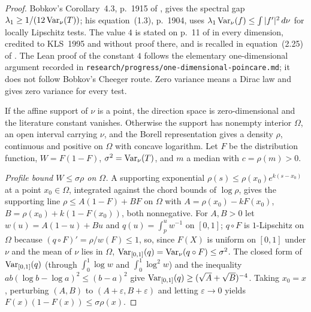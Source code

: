 \begin{proof}
  \leanok
  Bobkov's Corollary~4.3, p.~1915 of \cite{Bobkov1999LogConcave}, gives the spectral gap
  $\lambda_1\ge1/(12\operatorname{Var}_\nu(T))$; his equation~(1.3), p.~1904, uses
  $\lambda_1\operatorname{Var}_\nu(f)\le\int|f'|^2\,d\nu$ for locally Lipschitz tests.  The value $4$ is stated
  on p.~11 of \cite{AlonsoGutierrezBastero2015} in every dimension, credited to KLS~1995 and
  without proof there, and is recalled in equation~(2.25) of \cite{CattiauxGuillin2018Poincare}.
  The Lean proof of the
  constant $4$ follows the elementary one-dimensional argument recorded in
  \texttt{research/progress/one-dimensional-poincare.md}; it does not follow
  Bobkov's Cheeger route.  Zero variance means a Dirac law and gives zero variance for every test.

  If the affine support of $\nu$ is a point, the direction space is zero-dimensional and the
  literature constant vanishes.  Otherwise the support has nonempty interior $\Omega$, an open
  interval carrying $\nu$, and the Borell representation gives a density $\rho$, continuous and
  positive on $\Omega$ with concave logarithm.  Let $F$ be the distribution function,
  $W=F(1-F)$, $\sigma^2=\operatorname{Var}_\nu(T)$, and $m$ a median with $c=\rho(m)>0$.

  \emph{Profile bound $W\le\sigma\rho$ on $\Omega$.}  A supporting exponential
  $\rho(s)\le\rho(x_0)e^{k(s-x_0)}$ at a point $x_0\in\Omega$, integrated against the chord
  bounds of $\log\rho$, gives the supporting line $\rho\le A(1-F)+BF$ on $\Omega$ with
  $A=\rho(x_0)-kF(x_0)$, $B=\rho(x_0)+k(1-F(x_0))$, both nonnegative.  For $A,B>0$ let
  $w(u)=A(1-u)+Bu$ and $q(u)=\int_p^u w^{-1}$ on $[0,1]$; $q\circ F$ is $1$-Lipschitz on
  $\Omega$ because $(q\circ F)'=\rho/w(F)\le1$, so, since $F(X)$ is uniform on $[0,1]$ under
  $\nu$ and the mean of $\nu$ lies in $\Omega$, $\operatorname{Var}_{[0,1]}(q)=\operatorname{Var}_\nu(q\circ F)\le\sigma^2$.
  The closed form of $\operatorname{Var}_{[0,1]}(q)$ (through $\int_0^1\log w$ and $\int_0^1\log^2w$) and the
  inequality $ab(\log b-\log a)^2\le(b-a)^2$ give $\operatorname{Var}_{[0,1]}(q)\ge(\sqrt A+\sqrt B)^{-4}$.
  Taking $x_0=x$, perturbing $(A,B)$ to $(A+\varepsilon,B+\varepsilon)$ and letting
  $\varepsilon\to0$ yields $F(x)(1-F(x))\le\sigma\rho(x)$.


\end{proof}
